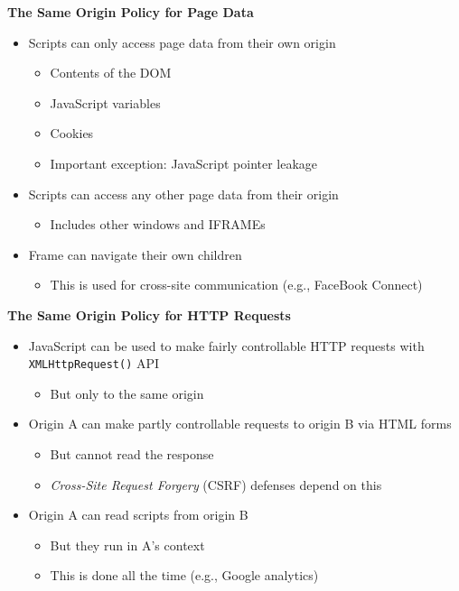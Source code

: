 \documentclass[helvetica]{seminar}
\newcommand{\heading}[1]{%
  \begin{center} 
    \large\bf 
    #1 
  \end{center} 
  \vspace{.4 in}}
\begin{document}
\begin{slide}
\heading{The Same Origin Policy for Page Data}
\begin{itemize}
\item Scripts can only access page data from their own origin
  \begin{itemize}
  \item Contents of the DOM
  \item JavaScript variables
  \item Cookies
  \item Important exception: JavaScript pointer leakage~\cite{barth-weinberger-song-cross-origin}
  \end{itemize}

\item Scripts can access any other page data from their origin
  \begin{itemize}
  \item Includes other windows and IFRAMEs
  \end{itemize}

\item Frame can navigate their own children
  \begin{itemize}
  \item This is used for cross-site communication (e.g., FaceBook Connect)
  \end{itemize}
\end{itemize}
\end{slide}



\begin{slide}
\heading{The Same Origin Policy for HTTP Requests}

\begin{itemize}
\item JavaScript can be used to make fairly controllable HTTP requests with \verb^XMLHttpRequest()^ API
  \begin{itemize}
  \item But only to the same origin 
  \end{itemize}

\item Origin A can make partly controllable requests to origin B via HTML forms
  \begin{itemize}
  \item But cannot read the response
  \item \emph{Cross-Site Request Forgery} (CSRF) defenses depend on this
  \end{itemize}

\item Origin A can read scripts from origin B
  \begin{itemize}
  \item But they run in A's context
  \item This is done all the time (e.g., Google analytics)
  \end{itemize}
\end{itemize}
\end{slide}
\end{document}
